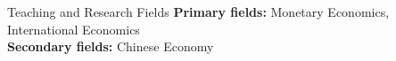 \documentclass{resume_liang} %
\begin{document}

\begin{rSection}{Teaching and Research Fields}
{\bf Primary fields:} Monetary Economics, International Economics \\ 
{\bf Secondary fields:} Chinese Economy  \\
\end{rSection}
\bigskip \bigskip






\end{document}
